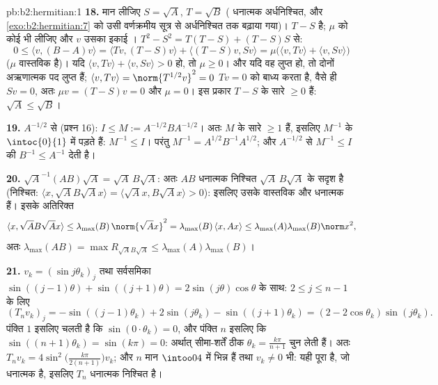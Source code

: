 \begin{solution}{pb:b2:hermitian:1}
\textbf{18.} मान लीजिए $S = \sqrt A$, $T = \sqrt B$ ( धनात्मक अर्धनिश्चित, और \cref{exo:b2:hermitian:7} को
उसी वर्णक्रमीय सूत्र से अर्धनिश्चित तक बढ़ाया गया)। $T - S$  है; $\mu$
को कोई भी  लीजिए और $v$ उसका इकाई । $T^2 - S^2 = T(T - S) + (T - S)S$ से:
\[
0 \leq \langle v, (B - A)v\rangle
= \langle Tv, (T-S)v\rangle + \langle (T-S)v, Sv\rangle
= \mu\bigl(\langle v, Tv\rangle + \langle v,
Sv\rangle\bigr)
\]
($\mu$ वास्तविक है)। यदि $\langle v, Tv\rangle + \langle v,
Sv\rangle > 0$ हो, तो $\mu \geq 0$। और यदि वह लुप्त हो, तो दोनों
अऋणात्मक पद लुप्त हैं; $\langle v, Tv\rangle =
\norm{T^{1/2}v}^2 = 0$ $Tv = 0$ को बाध्य करता है, वैसे ही $Sv = 0$, अतः $\mu v = (T - S)v = 0$
और $\mu = 0$। इस प्रकार $T -
S$ के सारे  $\geq 0$ हैं: $\sqrt A \leq \sqrt B$।

\textbf{19.} $A^{-1/2}$ से  (प्रश्न 16): $I \leq M
:= A^{-1/2}BA^{-1/2}$। अतः $M$ के सारे
 $\geq 1$ हैं, इसलिए $M^{-1}$ के  $\intoc{0}{1}$ में पड़ते हैं:
$M^{-1} \leq I$। परंतु $M^{-1} = A^{1/2}B^{-1}A^{1/2}$; और $A^{-1/2}$ से $M^{-1} \leq
I$ की  $B^{-1} \leq A^{-1}$ देती है।

\textbf{20.} $\sqrt A^{-1}(AB)\sqrt A = \sqrt A\,B\sqrt A$: अतः $AB$  धनात्मक निश्चित $\sqrt
A\,B\sqrt A$ के सदृश है
(निश्चित: $\langle x, \sqrt AB\sqrt Ax\rangle =
\langle \sqrt Ax, B\sqrt Ax\rangle > 0$): इसलिए उसके  वास्तविक और धनात्मक हैं। इसके
अतिरिक्त
\[
\langle x, \sqrt AB\sqrt Ax\rangle
\leq \lambda_{\max}(B)\,\norm{\sqrt Ax}^2
= \lambda_{\max}(B)\,\langle x, Ax\rangle
\leq \lambda_{\max}(A)\lambda_{\max}(B)\norm x^2 ,
\]
अतः $\lambda_{\max}(AB) = \max R_{\sqrt AB\sqrt A} \leq
\lambda_{\max}(A)\lambda_{\max}(B)$।

\textbf{21.} $v_k = (\sin j\theta_k)_j$ तथा सर्वसमिका $\sin((j-1)\theta) + \sin((j+1)\theta) =
2\sin(j\theta)\cos\theta$ के साथ: $2 \leq j \leq n-1$ के लिए
\[
(T_nv_k)_j = -\sin((j{-}1)\theta_k) + 2\sin(j\theta_k) -
\sin((j{+}1)\theta_k)
= (2 - 2\cos\theta_k)\sin(j\theta_k) .
\]
पंक्ति $1$ इसलिए चलती है कि $\sin(0\cdot\theta_k) = 0$, और पंक्ति $n$ इसलिए कि $\sin((n+1)\theta_k) = \sin(k\pi) = 0$: अर्थात्
सीमा-शर्तें ठीक $\theta_k = \frac{k\pi}{n+1}$ चुन लेती हैं। अतः $T_nv_k = 4\sin^2\bigl(\frac{k\pi}{2(n+1)}\bigr)v_k$; और $n$ मान $\intoo04$ में भिन्न हैं
तथा $v_k \neq 0$ भी: यही पूरा  है, जो धनात्मक है, इसलिए $T_n$ धनात्मक
निश्चित है।


\end{solution}
